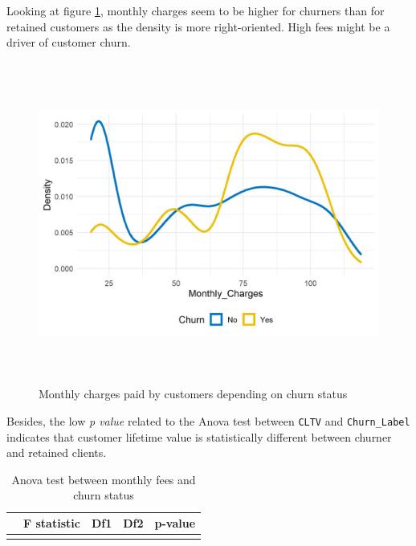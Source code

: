 \documentclass[
]{book}
\begin{document}
Looking at figure \ref{fig:cltvchurn}, monthly charges seem to be higher for churners than for retained customers as the density is more right-oriented. High fees might be a driver of customer churn.

\begin{figure}

{\centering \includegraphics[width=400pt,height=300pt]{./imgs/monthly_charges_churn_plot} 

}

\caption{Monthly charges paid by customers depending on churn status}\label{fig:cltvchurn}
\end{figure}

Besides, the low \emph{p value} related to the Anova test between \texttt{CLTV} and \texttt{Churn\_Label} indicates that customer lifetime value is statistically different between churner and retained clients.

\begin{table}[H]

\caption{\label{tab:aovcltvchurn}Anova test between monthly fees and churn status}
\centering
\begin{tabular}[t]{lrrrl}
\toprule
  & F statistic & Df1 & Df2 & p-value\\
\midrule
\cellcolor{gray!6}{Churn\_Label} & \cellcolor{gray!6}{271.58} & \cellcolor{gray!6}{1} & \cellcolor{gray!6}{7030} & \cellcolor{gray!6}{6.8e-60}\\
\bottomrule
\end{tabular}
\end{table}
\end{document}
